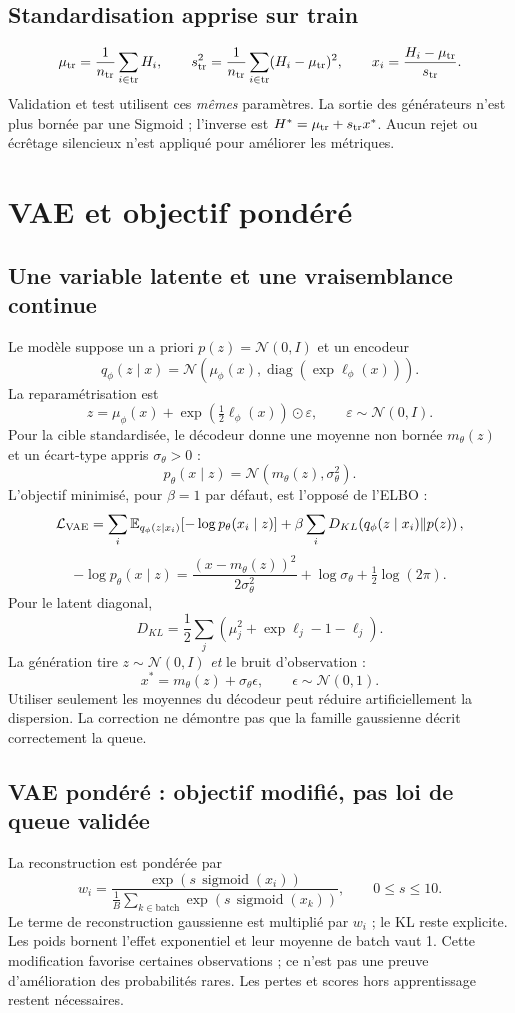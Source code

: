 \documentclass[11pt,a4paper]{article}
\newcommand{\E}{\mathbb E}
\begin{document}
\subsection*{Standardisation apprise sur train}
\[
\mu_{\rm tr}=\frac1{n_{\rm tr}}\sum_{i\in\rm tr}H_i,\qquad
s_{\rm tr}^2=\frac1{n_{\rm tr}}\sum_{i\in\rm tr}(H_i-\mu_{\rm tr})^2,
\qquad x_i=\frac{H_i-\mu_{\rm tr}}{s_{\rm tr}}.
\]
Validation et test utilisent ces \emph{mêmes} paramètres. La sortie des générateurs n'est plus bornée par une Sigmoid ; l'inverse est $H^*=\mu_{\rm tr}+s_{\rm tr}x^*$. Aucun rejet ou écrêtage silencieux n'est appliqué pour améliorer les métriques.

\newpage
\section{VAE et objectif pondéré}
\subsection*{Une variable latente et une vraisemblance continue}
Le modèle suppose un a priori $p(z)=\mathcal N(0,I)$ et un encodeur
\[
q_\phi(z\mid x)=\mathcal N\!\left(\mu_\phi(x),\operatorname{diag}(\exp\ell_\phi(x))\right).
\]
La reparamétrisation est
\[
z=\mu_\phi(x)+\exp\!\left(\tfrac12\ell_\phi(x)\right)\odot\varepsilon,
\qquad \varepsilon\sim\mathcal N(0,I).
\]
Pour la cible standardisée, le décodeur donne une moyenne non bornée $m_\theta(z)$ et un écart-type appris $\sigma_\theta>0$ :
\[
p_\theta(x\mid z)=\mathcal N(m_\theta(z),\sigma_\theta^2).
\]
L'objectif minimisé, pour $\beta=1$ par défaut, est l'opposé de l'ELBO :
\[
\mathcal L_{\rm VAE}=\sum_i\E_{q_\phi(z\mid x_i)}[-\log p_\theta(x_i\mid z)]
+\beta\sum_i D_{KL}\!\left(q_\phi(z\mid x_i)\|p(z)\right),
\]
\[
-\log p_\theta(x\mid z)=\frac{(x-m_\theta(z))^2}{2\sigma_\theta^2}
+\log\sigma_\theta+\tfrac12\log(2\pi).
\]
Pour le latent diagonal,
\[
D_{KL}=\frac12\sum_j\left(\mu_j^2+\exp\ell_j-1-\ell_j\right).
\]
La génération tire $z\sim\mathcal N(0,I)$ \emph{et} le bruit d'observation :
\[
\boxed{x^*=m_\theta(z)+\sigma_\theta\epsilon,\qquad\epsilon\sim\mathcal N(0,1).}
\]
Utiliser seulement les moyennes du décodeur peut réduire artificiellement la dispersion. La correction ne démontre pas que la famille gaussienne décrit correctement la queue.

\subsection*{VAE pondéré : objectif modifié, pas loi de queue validée}
La reconstruction est pondérée par
\[
w_i=\frac{\exp(s\,\operatorname{sigmoid}(x_i))}
{\frac1{B}\sum_{k\in\mathrm{batch}}\exp(s\,\operatorname{sigmoid}(x_k))},
\qquad 0\leq s\leq10.
\]
Le terme de reconstruction gaussienne est multiplié par $w_i$ ; le KL reste explicite. Les poids bornent l'effet exponentiel et leur moyenne de batch vaut 1. Cette modification favorise certaines observations ; ce n'est pas une preuve d'amélioration des probabilités rares. Les pertes et scores hors apprentissage restent nécessaires.
\end{document}
